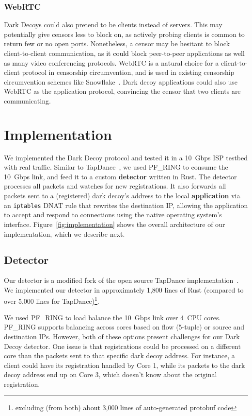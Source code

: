 \documentclass[letterpaper,twocolumn,10pt]{article}
\begin{document}
\subsubsection{WebRTC}

Dark Decoys could also pretend to be clients instead of servers. This may
potentially give censors less to block on, as actively probing clients is common
to return few or no open ports. Nonetheless, a censor may be hesitant to block
client-to-client communication, as it could block peer-to-peer applications as
well as many video conferencing protocols. WebRTC is a
natural choice for a client-to-client protocol in censorship circumvention,
and is used in existing censorship circumvention schemes like
Snowflake~\cite{snowflake}. Dark decoy applications could also use WebRTC as the
application protocol, convincing the censor that two clients are communicating.

\section{Implementation}
\label{sec:implementation}

We implemented the Dark Decoy protocol and tested it in a 10~Gbps ISP testbed
with real traffic. Similar to TapDance~\cite{tapdance14}, we used PF\_RING to
consume the 10~Gbps link, and feed it to a custom \textbf{detector} written in Rust. The
detector processes all packets and watches for new registrations. It also
forwards all packets sent to a (registered) dark decoy's address to the local
\textbf{application} via an \texttt{iptables} DNAT rule that rewrites the destination IP,
allowing the application to accept and respond to connections using the native
operating system's interface. Figure~\ref{fig:implementation} shows the overall
architecture of our implementation, which we describe next.

\FigImplementation

\subsection{Detector}

Our detector is a modified fork of the open source TapDance
implementation~\cite{tapdance-source}.
We implemented our detector in approximately 1,800 lines of Rust (compared to
over 5,000 lines for TapDance)\footnote{excluding (from both) about 3,000 lines
of auto-generated protobuf code}.

We used PF\_RING to load balance the 10~Gbps link over 4~CPU cores. PF\_RING
supports balancing across cores based on flow (5-tuple) or source and
destination IPs. However, both of these options present challenges for our Dark
Decoy detector. One issue is that registrations could be processed on a
different core than the packets sent to that specific dark decoy address. For
instance, a client could have its registration handled by Core 1, while its
packets to the dark decoy address end up on Core 3, which doesn't know about the
original registration.
\end{document}
